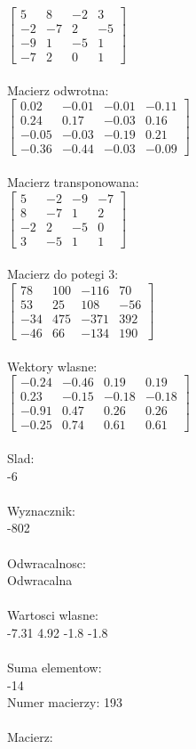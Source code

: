 \documentclass[a4paper,12pt]{article}
\begin{document}
$\begin{bmatrix} 5&8&-2&3\\-2&-7&2&-5\\-9&1&-5&1\\-7&2&0&1 \end{bmatrix}$
\\
\\
Macierz odwrotna:\\

$\begin{bmatrix} 0.02&-0.01&-0.01&-0.11\\0.24&0.17&-0.03&0.16\\-0.05&-0.03&-0.19&0.21\\-0.36&-0.44&-0.03&-0.09 \end{bmatrix}$
\\
\\
Macierz transponowana:\\

$\begin{bmatrix} 5&-2&-9&-7\\8&-7&1&2\\-2&2&-5&0\\3&-5&1&1 \end{bmatrix}$
\\
\\
Macierz do potegi 3:\\

$\begin{bmatrix} 78&100&-116&70\\53&25&108&-56\\-34&475&-371&392\\-46&66&-134&190 \end{bmatrix}$
\\
\\
Wektory wlasne:\\

$\begin{bmatrix} -0.24&-0.46&0.19&0.19\\0.23&-0.15&-0.18&-0.18\\-0.91&0.47&0.26&0.26\\-0.25&0.74&0.61&0.61 \end{bmatrix}$
\\
\\
Slad:\\
-6
\\
\\
Wyznacznik:\\
-802
\\
\\
Odwracalnosc:\\
Odwracalna
\\
\\
Wartosci wlasne:\\
-7.31 4.92 -1.8 -1.8
\\
\\
Suma elementow:\\
-14
\\
\newpage
Numer macierzy:
193
\\
\\
Macierz:\\
\end{document}
